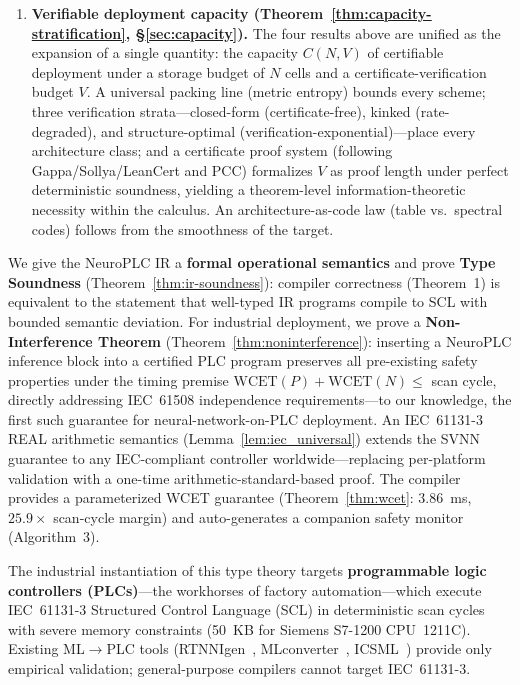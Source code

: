 \documentclass[journal,onecolumn]{IEEEtran}
\begin{document}
\begin{enumerate}[label=(\roman*)]
    \item \textbf{Verifiable deployment capacity
    (Theorem~\ref{thm:capacity-stratification}, {\S}\ref{sec:capacity}).}
    The four results above are unified as the expansion of a single
    quantity: the capacity $C(N, V)$ of certifiable deployment under a
    storage budget of $N$ cells and a certificate-verification budget
    $V$. A
    universal packing line (metric entropy) bounds every scheme; three
    verification strata---closed-form (certificate-free),
    kinked (rate-degraded), and structure-optimal
    (verification-exponential)---place every architecture class; and a
    certificate proof system (following Gappa/Sollya/LeanCert and PCC)
    formalizes $V$ as proof length under perfect deterministic
    soundness, yielding a theorem-level information-theoretic necessity
    within the calculus. An architecture-as-code law (table vs.\
    spectral codes) follows from the smoothness of the target.
\end{enumerate}

We give the NeuroPLC IR a \textbf{formal operational semantics} and
prove \textbf{Type Soundness} (Theorem~\ref{thm:ir-soundness}): compiler correctness
(Theorem~1) is equivalent to the statement that well-typed IR programs
compile to SCL with bounded semantic deviation. For industrial deployment,
we prove a \textbf{Non-Interference Theorem} (Theorem~\ref{thm:noninterference}): inserting a
NeuroPLC inference block into a certified PLC program preserves all
pre-existing safety properties under the timing premise
$\text{WCET}(P) + \text{WCET}(N) \leq$ scan cycle, directly addressing
IEC~61508 independence requirements---to our knowledge, the first such
guarantee for neural-network-on-PLC deployment. An IEC~61131-3 REAL arithmetic
semantics (Lemma~\ref{lem:iec_universal}) extends the SVNN guarantee
to any IEC-compliant controller worldwide---replacing per-platform
validation with a one-time arithmetic-standard-based proof.
The compiler provides a parameterized WCET guarantee
(Theorem~\ref{thm:wcet}: $3.86$~ms, $25.9\times$ scan-cycle margin)
and auto-generates a companion safety monitor (Algorithm~3).

The industrial instantiation of this type theory targets
\textbf{programmable logic controllers (PLCs)}---the workhorses of factory
automation---which execute IEC~61131-3 Structured Control Language (SCL) in
deterministic scan cycles with severe memory constraints (50~KB for Siemens
S7-1200 CPU~1211C). Existing ML$\to$PLC tools
(RTNNIgen~\cite{rtnnigen2024}, MLconverter~\cite{mlconverter2025},
ICSML~\cite{icsml2023}) provide only empirical validation; general-purpose
compilers cannot target IEC~61131-3.
\end{document}

